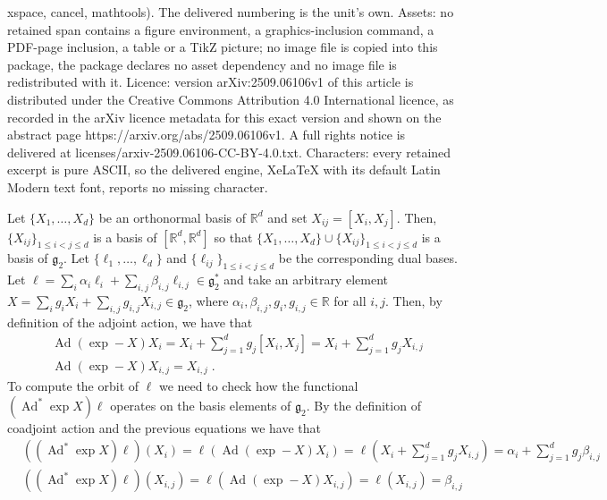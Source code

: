 \documentclass[10pt,a4paper]{amsart}
\newcommand{\Adjoint}{\operatorname{Ad}}
\newcommand{\coadjoint}{\operatorname{Ad}^*}
\newcommand{\fancyg}{\mathfrak{g}}
\begin{document}
xspace, cancel, mathtools). The delivered numbering is the unit's own. Assets: no retained span contains a figure environment, a graphics-inclusion command, a PDF-page inclusion, a table or a TikZ picture; no image file is copied into this package, the package declares no asset dependency and no image file is redistributed with it. Licence: version arXiv:2509.06106v1 of this article is distributed under the Creative Commons Attribution 4.0 International licence, as recorded in the arXiv licence metadata for this exact version and shown on the abstract page https://arxiv.org/abs/2509.06106v1. A full rights notice is delivered at licenses/arxiv-2509.06106-CC-BY-4.0.txt. Characters: every retained excerpt is pure ASCII, so the delivered engine, XeLaTeX with its default Latin Modern text font, reports no missing character.
	\begin{example}\label{ex: explicit orbits of g2}
		Let $\{X_1, \ldots, X_d\}$ be an orthonormal basis of $\mathbb{R}^d$ and  set $X_{ij} = [X_i,X_j]$. Then, $\{X_{ij}\}_{1\leq i<j\leq d}$ is a basis of $[\mathbb{R}^d, \mathbb{R}^d]$ so that $\{X_1, \ldots, X_d\} \cup \{X_{ij}\}_{1\leq i<j\leq d}$ is a basis of $\fancyg_2$. Let  $\{\ell_1, \ldots, \ell_{d}\}$ and $\{\ell_{ij}\}_{1\leq i<j\leq d}$ be the corresponding dual bases.\\
		Let $\ell = \sum_i \alpha_i \ell_i + \sum_{i,j} \beta_{i,j} \ell_{i,j} \in \fancyg_2^*$ and take an arbitrary element $X = \sum_{i} g_{i}X_i +  \sum_{i,j} g_{i,j} X_{i,j} \in \fancyg_2$, where $\alpha_i, \beta_{i,j}, g_{i},g_{i,j} \in \mathbb{R}$ for all $i,j$. Then, by definition of the adjoint action, we have that
		\begin{align*}
			&\Adjoint(\operatorname{exp}-X)X_i =X_i+\sum_{j=1}^d g_j[X_i, X_j] = X_i + \sum_{j=1}^d g_j X_{i,j}\\ %
			& \Adjoint(\operatorname{exp}-X)X_{i,j} = X_{i,j} \;.
		\end{align*}
		To compute the orbit of $\ell$ we need to check how the functional  $(\coadjoint \exp X)\ell$ operates on the basis elements of $\fancyg_2$. By the definition of coadjoint action and the previous equations we have that
		\begin{align*}
			&((\coadjoint \exp X)\ell)(X_i) = \ell(\Adjoint(\exp -X)X_i) = \ell\left(X_i + \sum_{j=1}^d g_j X_{i,j}\right) = \alpha_i + \sum_{j=1}^d g_j\beta_{i,j} \\
			&((\coadjoint \exp X)\ell)(X_{i,j}) = \ell(\Adjoint(\exp -X)X_{i,j}) = \ell(X_{i,j}) = \beta_{i,j}

\end{align*}
\end{example}
\end{document}
